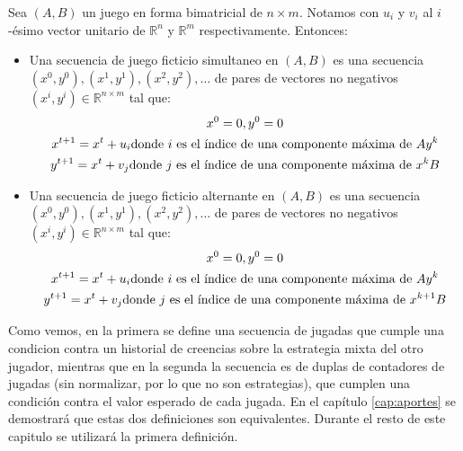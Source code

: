 \begin{definition} \label{def:fp:brandt}
    Sea $(A, B)$ un juego en forma bimatricial de $n \times m$. Notamos con $u_i$ y $v_i$ al $i$-ésimo vector unitario de $\mathbb{R}^n$ y $\mathbb{R}^m$ respectivamente. Entonces:
    \begin{itemize}
        \item Una secuencia de juego ficticio simultaneo en $(A, B)$ es una secuencia $(x^0, y^0), (x^1, y^1), (x^2, y^2), \dots$ de pares de vectores no negativos $(x^i, y^i) \in \mathbb{R}^{n \times m}$ tal que:
        \begin{gather}
            x^0 = \boldmath{0}, y^0 = \boldmath{0} \\
            x^{t+1} = x^{t} + u_i \text{donde $i$ es el índice de una componente máxima de $Ay^k$} \\
            y^{t+1} = x^{t} + v_j \text{donde $j$ es el índice de una componente máxima de $x^kB$}
        \end{gather}
        \item Una secuencia de juego ficticio alternante en $(A, B)$ es una secuencia $(x^0, y^0), (x^1, y^1), (x^2, y^2), \dots$ de pares de vectores no negativos $(x^i, y^i) \in \mathbb{R}^{n \times m}$ tal que:
        \begin{gather}
            x^0 = \boldmath{0}, y^0 = \boldmath{0} \\
            x^{t+1} = x^{t} + u_i \text{donde $i$ es el índice de una componente máxima de $Ay^k$} \\
            y^{t+1} = x^{t} + v_j \text{donde $j$ es el índice de una componente máxima de $x^{k+1}B$}
        \end{gather}
    \end{itemize}
\end{definition}

Como vemos, en la primera se define una secuencia de jugadas que cumple una condicion contra un historial de creencias sobre la estrategia mixta del otro jugador, mientras que en la segunda la secuencia es de duplas de contadores de jugadas (sin normalizar, por lo que no son estrategias), que cumplen una condición contra el valor esperado de cada jugada. En el capítulo \ref{cap:aportes} se demostrará que estas dos definiciones son equivalentes. Durante el resto de este capitulo se utilizará la primera definición.






